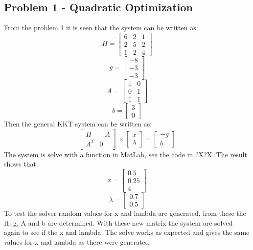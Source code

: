 \subsection{Problem 1 - Quadratic Optimization}
From the problem 1 it is seen that the system can be written as:
\[H=\begin{bmatrix}
	6 & 2 & 1 \\2 & 5 & 2 \\1 & 2 & 4
\end{bmatrix}\]
\[g=\begin{bmatrix}
	-8 \\-3 \\ -3
\end{bmatrix}\]
\[A=\begin{bmatrix}
	1 & 0 \\ 0 & 1 \\ 1 & 1
\end{bmatrix}\]
\[b= \begin{bmatrix}
	3 \\ 0
\end{bmatrix}\]
Then the general KKT system can be written as:
\[\begin{bmatrix}
	H & -A \\A^T & 0
\end{bmatrix} \times \begin{bmatrix}
	x\\ \lambda
\end{bmatrix} =\begin{bmatrix}
	-g\\ b
\end{bmatrix}\]
The system is solve with a function in MatLab, see the code in ?X?X. The result shows that:
\[x=\begin{bmatrix}
	0.5 \\ 0.25 \\ 4
\end{bmatrix}\]
\[\lambda=\begin{bmatrix}
	0.7 \\0.5 
\end{bmatrix}\]
To test the solver random values for x and lambda are generated, from these the H, g, A and b are determined. With these new matrix the system are solved again to see if the x and lambda. The solve works as expected and gives the same values for x and lambda as there were generated.

